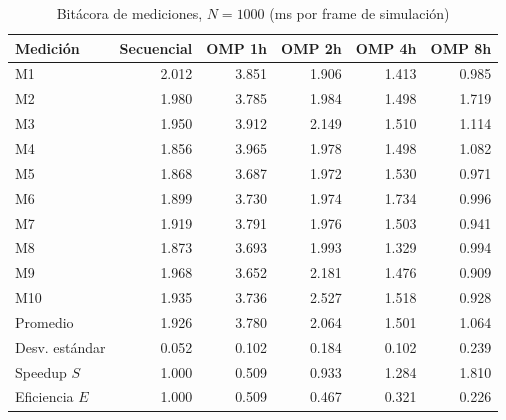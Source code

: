 \begin{table}[H]
\centering\small
\caption{Bitácora de mediciones, $N=1000$ (ms por frame de simulación)}
\begin{tabular}{lrrrrr}
\toprule
Medición & Secuencial & OMP 1h & OMP 2h & OMP 4h & OMP 8h \\
\midrule
M1 & 2.012 & 3.851 & 1.906 & 1.413 & 0.985 \\
M2 & 1.980 & 3.785 & 1.984 & 1.498 & 1.719 \\
M3 & 1.950 & 3.912 & 2.149 & 1.510 & 1.114 \\
M4 & 1.856 & 3.965 & 1.978 & 1.498 & 1.082 \\
M5 & 1.868 & 3.687 & 1.972 & 1.530 & 0.971 \\
M6 & 1.899 & 3.730 & 1.974 & 1.734 & 0.996 \\
M7 & 1.919 & 3.791 & 1.976 & 1.503 & 0.941 \\
M8 & 1.873 & 3.693 & 1.993 & 1.329 & 0.994 \\
M9 & 1.968 & 3.652 & 2.181 & 1.476 & 0.909 \\
M10 & 1.935 & 3.736 & 2.527 & 1.518 & 0.928 \\
\midrule
Promedio & 1.926 & 3.780 & 2.064 & 1.501 & 1.064 \\
Desv. estándar & 0.052 & 0.102 & 0.184 & 0.102 & 0.239 \\
Speedup $S$ & 1.000 & 0.509 & 0.933 & 1.284 & 1.810 \\
Eficiencia $E$ & 1.000 & 0.509 & 0.467 & 0.321 & 0.226 \\
\bottomrule
\end{tabular}
\end{table}

